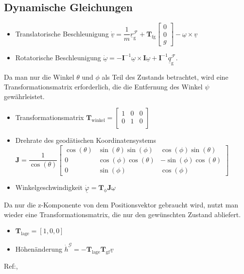 \documentclass[10pt,a4paper]{article}
\begin{document}
\subsection{Dynamische Gleichungen}
\begin{itemize}
\item Translatorische Beschleunigung $\underline{\dot{v}} = \dfrac{1}{m}\underline{r}^\mathcal{F}_\mathrm{g} + \textbf{T}_\mathrm{fg}\begin{bmatrix} 
0\\
0\\
g
\end{bmatrix} - \underline{\omega}\times\underline{v}$
\item Rotatorische Beschleunigung $\underline{\dot{\omega}} = -\textbf{I}^{-1}\underline{\omega}\times\textbf{I}\underline{\omega} + \textbf{I}^{-1}\underline{q}^\mathcal{F}_\mathrm{g}$.
\end{itemize}
Da man nur die Winkel $\theta$ und $\phi$ als Teil des Zustands betrachtet, wird eine Transformationsmatrix erforderlich, die die Entfernung des Winkel $\psi$ gewährleistet.
\begin{itemize}
\item Transformationsmatrix $\textbf{T}_\mathrm{winkel} = \begin{bmatrix} 
1 & 0&0\\
0&1&0\\
\end{bmatrix}$
\item Drehrate des geodätischen Koordinatensystems $\textbf{J} = \dfrac{1}{\cos(\theta)}\begin{bmatrix} 
\cos(\theta) & \sin(\theta)\sin(\phi)&\cos(\phi)\sin(\theta)\\
0&\cos(\phi)\cos(\theta)&-\sin(\phi)\cos(\theta)\\
0&\sin(\phi)& \cos(\phi)
\end{bmatrix} $
\item Winkelgeschwindigkeit $\underline{\dot{\varphi}} = \textbf{T}_\mathrm{\phi}\textbf{J}\underline{\omega}$ 
\end{itemize}
Da nur die z-Komponente von dem Positionsvektor gebraucht wird, nutzt man wieder eine Transformationsmatrix, die nur den gewünschten Zustand abliefert.
\begin{itemize}
\item $\textbf{T}_\mathrm{lage} = [1, 0, 0]$
\item Höhenänderung $\dot{h}^\mathcal{G} = -\textbf{T}_\mathrm{lage}\textbf{T}_\mathrm{gf}\underline{v}$
\end{itemize}
Ref:\cite{FlugmechanikBuch}, \cite{RAMPaper}


\end{document}
